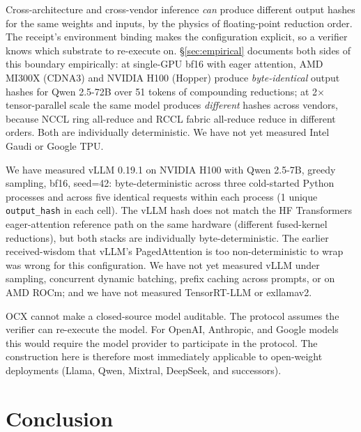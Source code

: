 \documentclass[10pt]{article}
\begin{document}
Cross-architecture and cross-vendor inference \emph{can} produce different output hashes for the same weights and inputs, by the physics of floating-point reduction order. The receipt's environment binding makes the configuration explicit, so a verifier knows which substrate to re-execute on. \S\ref{sec:empirical} documents both sides of this boundary empirically: at single-GPU bf16 with eager attention, AMD MI300X (CDNA3) and NVIDIA H100 (Hopper) produce \emph{byte-identical} output hashes for Qwen 2.5-72B over 51 tokens of compounding reductions; at 2$\times$ tensor-parallel scale the same model produces \emph{different} hashes across vendors, because NCCL ring all-reduce and RCCL fabric all-reduce reduce in different orders. Both are individually deterministic. We have not yet measured Intel Gaudi or Google TPU.

We have measured vLLM 0.19.1 on NVIDIA H100 with Qwen 2.5-7B, greedy sampling, bf16, seed=42: byte-deterministic across three cold-started Python processes and across five identical requests within each process (1 unique \texttt{output\_hash} in each cell). The vLLM hash does not match the HF Transformers eager-attention reference path on the same hardware (different fused-kernel reductions), but both stacks are individually byte-deterministic. The earlier received-wisdom that vLLM's PagedAttention is too non-deterministic to wrap was wrong for this configuration. We have not yet measured vLLM under sampling, concurrent dynamic batching, prefix caching across prompts, or on AMD ROCm; and we have not measured TensorRT-LLM or exllamav2.

OCX cannot make a closed-source model auditable. The protocol assumes the verifier can re-execute the model. For OpenAI, Anthropic, and Google models this would require the model provider to participate in the protocol. The construction here is therefore most immediately applicable to open-weight deployments (Llama, Qwen, Mixtral, DeepSeek, and successors).

\section{Conclusion}
\label{sec:conclusion}
\end{document}
